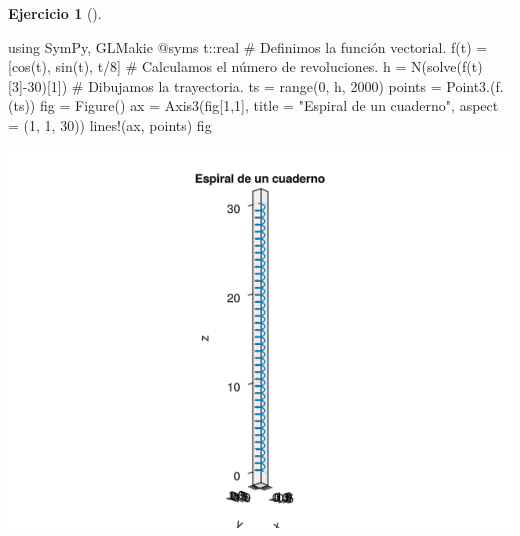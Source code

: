 \documentclass[
  a4paper,
]{scrreport}
\newenvironment{Shaded}{\begin{snugshade}}{\end{snugshade}}
\newcommand{\BuiltInTok}[1]{\textcolor[rgb]{0.00,0.23,0.31}{#1}}
\newcommand{\CommentTok}[1]{\textcolor[rgb]{0.37,0.37,0.37}{#1}}
\newcommand{\DataTypeTok}[1]{\textcolor[rgb]{0.68,0.00,0.00}{#1}}
\newcommand{\FloatTok}[1]{\textcolor[rgb]{0.68,0.00,0.00}{#1}}
\newcommand{\FunctionTok}[1]{\textcolor[rgb]{0.28,0.35,0.67}{#1}}
\newcommand{\ImportTok}[1]{\textcolor[rgb]{0.00,0.46,0.62}{#1}}
\newcommand{\NormalTok}[1]{\textcolor[rgb]{0.00,0.23,0.31}{#1}}
\newcommand{\OperatorTok}[1]{\textcolor[rgb]{0.37,0.37,0.37}{#1}}
\newcommand{\PreprocessorTok}[1]{\textcolor[rgb]{0.68,0.00,0.00}{#1}}
\newcommand{\StringTok}[1]{\textcolor[rgb]{0.13,0.47,0.30}{#1}}
\theoremstyle{definition}
\newtheorem{exercise}{Ejercicio}[chapter]
\theoremstyle{remark}
\begin{document}
\begin{exercise}[]
\begin{tcolorbox}
\begin{Shaded}
\begin{Highlighting}[]
\ImportTok{using} \BuiltInTok{SymPy}\NormalTok{, }\BuiltInTok{GLMakie}
\PreprocessorTok{@syms}\NormalTok{ t}\OperatorTok{::}\DataTypeTok{real}
\CommentTok{\# Definimos la función vectorial.}
\FunctionTok{f}\NormalTok{(t) }\OperatorTok{=}\NormalTok{ [}\FunctionTok{cos}\NormalTok{(t), }\FunctionTok{sin}\NormalTok{(t), t}\OperatorTok{/}\FloatTok{8}\NormalTok{]}
\CommentTok{\# Calculamos el número de revoluciones.}
\NormalTok{h }\OperatorTok{=} \FunctionTok{N}\NormalTok{(}\FunctionTok{solve}\NormalTok{(}\FunctionTok{f}\NormalTok{(t)[}\FloatTok{3}\NormalTok{]}\OperatorTok{{-}}\FloatTok{30}\NormalTok{)[}\FloatTok{1}\NormalTok{])}
\CommentTok{\# Dibujamos la trayectoria.}
\NormalTok{ts }\OperatorTok{=} \FunctionTok{range}\NormalTok{(}\FloatTok{0}\NormalTok{, h, }\FloatTok{2000}\NormalTok{)}
\NormalTok{points }\OperatorTok{=} \FunctionTok{Point3}\NormalTok{.(}\FunctionTok{f}\NormalTok{.(ts))}
\NormalTok{fig }\OperatorTok{=} \FunctionTok{Figure}\NormalTok{()}
\NormalTok{ax }\OperatorTok{=} \FunctionTok{Axis3}\NormalTok{(fig[}\FloatTok{1}\NormalTok{,}\FloatTok{1}\NormalTok{], title }\OperatorTok{=} \StringTok{"Espiral de un cuaderno"}\NormalTok{, aspect }\OperatorTok{=}\NormalTok{ (}\FloatTok{1}\NormalTok{, }\FloatTok{1}\NormalTok{, }\FloatTok{30}\NormalTok{))}
\FunctionTok{lines!}\NormalTok{(ax, points)}
\NormalTok{fig}
\end{Highlighting}
\end{Shaded}

\includegraphics{08-funciones-vectoriales_files/figure-pdf/cell-19-output-1.png}


\end{tcolorbox}
\end{exercise}
\end{document}
